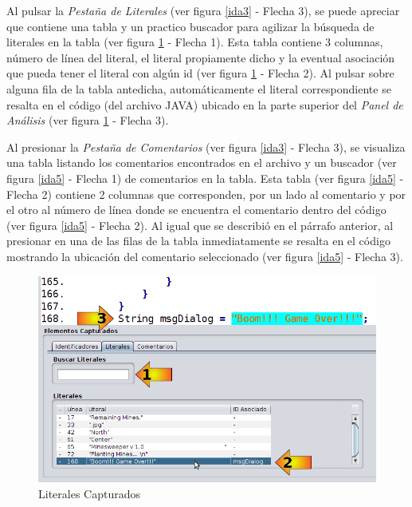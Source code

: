 Al pulsar la \textit{Pestaña de Literales} (ver figura \ref{ida3} - Flecha 3), se puede apreciar que contiene una tabla y un practico buscador para agilizar la búsqueda de literales en la tabla (ver figura \ref{ida4} - Flecha 1). Esta tabla contiene 3 columnas, número de línea del literal, el literal propiamente dicho y la eventual asociación que pueda tener el literal con algún id (ver figura \ref{ida4} - Flecha 2). Al pulsar sobre alguna fila de la tabla antedicha, automáticamente el literal correspondiente se resalta en el código (del archivo JAVA) ubicado en la parte superior del \textit{Panel de Análisis} (ver figura \ref{ida4} - Flecha 3).

Al presionar la \textit{Pestaña de Comentarios} (ver figura \ref{ida3} - Flecha 3), se visualiza una tabla listando los comentarios encontrados en el archivo y un buscador (ver figura \ref{ida5} - Flecha 1) de comentarios en la tabla. Esta tabla (ver figura \ref{ida5} - Flecha 2) contiene 2 columnas que corresponden, por un lado al comentario y por el otro al número de línea donde se encuentra el comentario dentro del código (ver figura \ref{ida5} - Flecha 2). Al igual que se describió en el párrafo anterior, al presionar en una de las filas de la tabla inmediatamente se resalta en el código mostrando la ubicación del comentario seleccionado (ver figura \ref{ida5} - Flecha 3).

\begin{figure}[t] %
\centerline{%
\includegraphics[scale= 0.58]{./cap4/ida_04.png}
}
\caption{Literales Capturados}
\label{ida4}
\end{figure}

